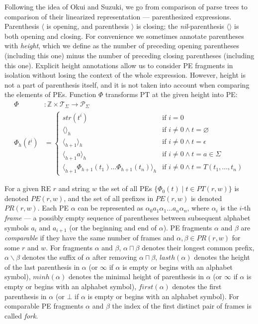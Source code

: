 \documentclass[AMA,STIX1COL]{WileyNJD-v2}
\newcommand{\Xl}{\langle}
\newcommand{\Xr}{\rangle}
\newcommand{\Xm}{\langle\!\rangle}
\newcommand{\XP}{\mathcal{P}}
\newcommand{\XT}{\mathcal{T}}
\newcommand{\YZ}{\mathbb{Z}}
\newcommand{\PE}{P\!E}
\newcommand{\PR}{P\!R}
\begin{document}
Following the idea of Okui and Suzuki,
we go from comparison of parse trees to comparison of their linearized representation --- parenthesized expressions.
Parenthesis $\Xl$ is opening, and
parenthesis $\Xr$ is closing;
the \emph{nil}-parenthesis $\Xm$ is both opening and closing.
For convenience we sometimes annotate parentheses with \emph{height},
which we define as the number of preceding opening parentheses (including this one)
minus the number of preceding closing parentheses (including this one).
Explicit height annotations allow us to consider PE fragments in isolation
without losing the context of the whole expression.
However, height is not a part of parenthesis itself,
and it is not taken into account when comparing the elements of PEs.
Function $\Phi$ transforms PT at the given height into PE:
%
    \begin{align*}
    \Phi &: \YZ \times \XT_\Sigma \rightarrow \XP_\Sigma
    \\
    \Phi_{h}(t^{i}) &= \begin{cases}
        str(t^{i})                                            &\text{if } i = 0 \\[-0.2em]
        \Xm_h                                                 &\text{if } i \neq 0 \wedge t = \varnothing \\[-0.2em]
        \Xl_{h+1} \Xr_h                                       &\text{if } i \neq 0 \wedge t = \epsilon \\[-0.2em]
        \Xl_{h+1} a \Xr_h                                     &\text{if } i \neq 0 \wedge t = a \in \Sigma \\[-0.2em]
        \Xl_{h+1} \Phi_{h+1}(t_1) \dots \Phi_{h+1}(t_n) \Xr_h &\text{if } i \neq 0 \wedge t = T(t_1, \dots, t_n)
    \end{cases}
    \end{align*}

For a given RE $r$ and string $w$ the set of all PEs $\big\{ \Phi_{0}(t) \mid t \in PT(r, w) \big\}$ is denoted $\PE(r, w)$,
and the set of all prefixes in $\PE(r, w)$ is denoted $\PR(r, w)$.
Each PE $\alpha$ can be represented as $\alpha_0 a_1 \alpha_1 \dots a_n \alpha_n$,
where $\alpha_i$ is the $i$-th \emph{frame} --- a possibly empty sequence of parentheses between
subsequent alphabet symbols $a_i$ and $a_{i+1}$ (or the beginning and end of $\alpha$).
PE fragments $\alpha$ and $\beta$ are \emph{comparable}
if they have the same number of frames and $\alpha, \beta \in \PR(r, w)$ for some $r$ and $w$.
%
For fragments $\alpha$ and $\beta$,
$\alpha \sqcap \beta$ denotes their longest common prefix,
$\alpha \backslash \beta$ denotes the suffix of $\alpha$ after removing $\alpha \sqcap \beta$,
$lasth(\alpha)$ denotes the height of the last parenthesis in $\alpha$ (or $\infty$ if $\alpha$ is empty or begins with an alphabet symbol),
$minh(\alpha)$ denotes the minimal height of parenthesis in $\alpha$ (or $\infty$ if $\alpha$ is empty or begins with an alphabet symbol),
$f\!irst(\alpha)$ denotes the first parenthesis in $\alpha$ (or $\bot$ if $\alpha$ is empty or begins with an alphabet symbol).
For comparable PE fragments $\alpha$ and $\beta$ the index of the first distinct pair of frames is called \emph{fork}.
\end{document}
